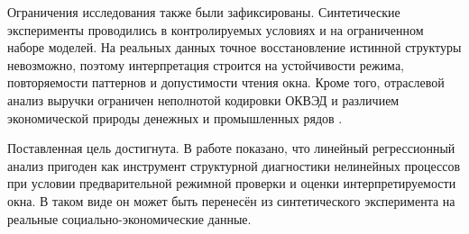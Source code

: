 Ограничения исследования также были зафиксированы. Синтетические эксперименты проводились в контролируемых условиях и на ограниченном наборе моделей. На реальных данных точное восстановление истинной структуры невозможно, поэтому интерпретация строится на устойчивости режима, повторяемости паттернов и допустимости чтения окна. Кроме того, отраслевой анализ выручки ограничен неполнотой кодировки ОКВЭД и различием экономической природы денежных и промышленных рядов \cite{minec-okved,rosstat-okved,rosstat-ipp,hse-iipp}.

Поставленная цель достигнута. В работе показано, что линейный регрессионный анализ пригоден как инструмент структурной диагностики нелинейных процессов при условии предварительной режимной проверки и оценки интерпретируемости окна. В таком виде он может быть перенесён из синтетического эксперимента на реальные социально-экономические данные.
